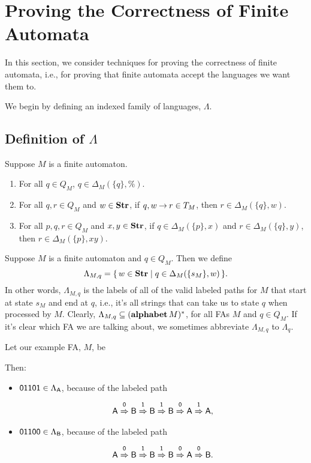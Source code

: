 \section{Proving the Correctness of Finite Automata}
\label{ProvingTheCorrectnessOfFiniteAutomata}

In this section, we consider techniques for proving the correctness
of finite automata, i.e., for proving that finite automata accept
the languages we want them to.

We begin by defining an indexed family of languages, $\Lambda$.

\subsection{Definition of $\Lambda$}

\begin{proposition}
\label{DeltaProp1}
Suppose $M$ is a finite automaton.
\begin{enumerate}[\quad(1)]
\item For all $q\in Q_M$, ${q}\in\Delta_M(\{q\},\%)$.

\item For all $q,r\in Q_M$ and $w\in\mathbf{Str}$, if $q,w\mathbin{\to} r\in T_M$,
then ${r}\in\Delta_M(\{q\},w)$.

\item For all $p,q,r\in Q_M$ and $x,y\in\mathbf{Str}$, if $q\in\Delta_M(\{p\},x)$
and $r\in\Delta_M(\{q\},y)$, then
${r}\in\Delta_M(\{p\},xy)$.
\end{enumerate}
\end{proposition}

Suppose $M$ is a finite automaton and $q\in Q_M$.
Then we define
\begin{displaymath}
\Lambda_{M,q} = \{ \, w\in\mathbf{Str} \mid q\in\Delta_M(\{s_M\},w) \, \}.
\end{displaymath}
In other words, $\Lambda_{M,q}$ is the labels of all of the valid
labeled paths for $M$ that start at state $s_M$ and end at $q$, i.e.,
it's all strings that can take us to state $q$ when processed by $M$.
Clearly, $\Lambda_{M,q}\subseteq(\mathbf{alphabet}\,M)^*$, for all FAs $M$ and
$q\in Q_M$.  If it's clear which FA we are talking about, we sometimes
abbreviate $\Lambda_{M,q}$ to $\Lambda_q$.

Let our example FA, $M$, be
\begin{center}

\end{center}
Then:
\begin{itemize}
\item $\mathsf{01101}\in\Lambda_{\mathsf{A}}$, because of the labeled path
  \begin{gather*}
    \mathsf{A\stackrel{\strut0}{\Rightarrow}B\stackrel{\strut1}{\Rightarrow}B\stackrel{\strut1}{\Rightarrow}B\stackrel{\strut0}{\Rightarrow}A\stackrel{\strut1}{\Rightarrow}A} ,
  \end{gather*}

\item $\mathsf{01100}\in\Lambda_{\mathsf{B}}$, because of the labeled path
  \begin{gather*}
    \mathsf{A\stackrel{\strut0}{\Rightarrow}B\stackrel{\strut1}{\Rightarrow}B\stackrel{\strut1}{\Rightarrow}B\stackrel{\strut0}{\Rightarrow}A\stackrel{\strut0}{\Rightarrow}B} .
  \end{gather*}
\end{itemize}


